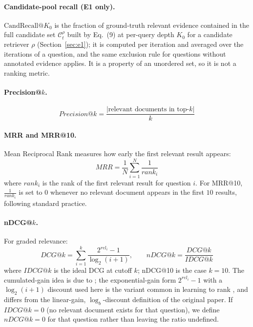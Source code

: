 \documentclass[11pt,a4paper]{article}
\begin{document}
\paragraph{Candidate-pool recall (E1 only).}
$\mathrm{CandRecall}@K_0$ is the fraction of ground-truth relevant evidence contained in the full candidate set $\mathcal{C}_t^{\rho}$ built by Eq.~(9) at per-query depth $K_0$ for a candidate retriever $\rho$ (Section~\ref{sec:e1}); it is computed per iteration and averaged over the iterations of a question, and the same exclusion rule for questions without annotated evidence applies. It is a property of an unordered set, so it is not a ranking metric.

\paragraph{Precision@$k$.}
\[
\boxed{
Precision@k
=
\frac{
|\text{relevant documents in top-}k|
}{
k
}
}
\]

\paragraph{MRR and MRR@10.} Mean Reciprocal Rank measures how early the first relevant result appears:
\[
\boxed{
MRR
=
\frac{1}{N}
\sum_{i=1}^{N}
\frac{1}{rank_i}
}
\]
where $rank_i$ is the rank of the first relevant result for question $i$. For MRR@10, $\frac{1}{rank_i}$ is set to $0$ whenever no relevant document appears in the first $10$ results, following standard practice.

\paragraph{nDCG@$k$.} For graded relevance:
\[
DCG@k
=
\sum_{i=1}^{k}
\frac{2^{rel_i}-1}{\log_2(i+1)},
\qquad
\boxed{
nDCG@k
=
\frac{DCG@k}{IDCG@k}
}
\]
where $IDCG@k$ is the ideal DCG at cutoff $k$; nDCG@10 is the case $k=10$. The cumulated-gain idea is due to \citet{jarvelin-kekalainen-2002}; the exponential-gain form $2^{rel_i}-1$ with a $\log_2(i+1)$ discount used here is the variant common in learning to rank \citep{burges-2005-ranknet}, and differs from the linear-gain, $\log_b$-discount definition of the original paper. If $IDCG@k=0$ (no relevant document exists for that question), we define $nDCG@k=0$ for that question rather than leaving the ratio undefined.
\end{document}
